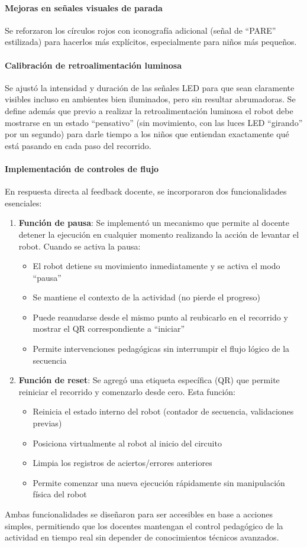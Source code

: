 \documentclass{prgrado}
\begin{document}
\paragraph{Mejoras en señales visuales de parada} Se reforzaron los círculos rojos con iconografía adicional (señal de ``PARE'' estilizada) para hacerlos más explícitos, especialmente para niños más pequeños.
\paragraph{Calibración de retroalimentación luminosa} Se ajustó la intensidad y duración de las señales LED para que sean claramente visibles incluso en ambientes bien iluminados, pero sin resultar abrumadoras. Se define además que previo a realizar la retroalimentación luminosa el robot debe mostrarse en un estado ``pensativo'' (sin movimiento, con las luces LED ``girando'' por un segundo) para darle tiempo a los niños que entiendan exactamente qué está pasando en cada paso del recorrido.
\paragraph{Implementación de controles de flujo} En respuesta directa al feedback docente, se incorporaron dos funcionalidades esenciales:
\begin{enumerate}
\item \textbf{Función de pausa}: Se implementó un mecanismo que permite al docente detener la ejecución en cualquier momento realizando la acción de levantar el robot. Cuando se activa la pausa:
\begin{itemize}
\item El robot detiene su movimiento inmediatamente y se activa el modo ``pausa''
\item Se mantiene el contexto de la actividad (no pierde el progreso)
\item Puede reanudarse desde el mismo punto al reubicarlo en el recorrido y mostrar el QR correspondiente a ``iniciar''
\item Permite intervenciones pedagógicas sin interrumpir el flujo lógico de la secuencia
\end{itemize}
\item \textbf{Función de reset}: Se agregó una etiqueta específica (QR)  que permite reiniciar el recorrido y comenzarlo desde cero. Esta función:
\begin{itemize}
\item Reinicia el estado interno del robot (contador de secuencia, validaciones previas)
\item Posiciona virtualmente al robot al inicio del circuito
\item Limpia los registros de aciertos/errores anteriores
\item Permite comenzar una nueva ejecución rápidamente sin manipulación física del robot
\end{itemize}
\end{enumerate}
Ambas funcionalidades se diseñaron para ser accesibles en base a acciones simples, permitiendo que los docentes mantengan el control pedagógico de la actividad en tiempo real sin depender de conocimientos técnicos avanzados.
\end{document}
